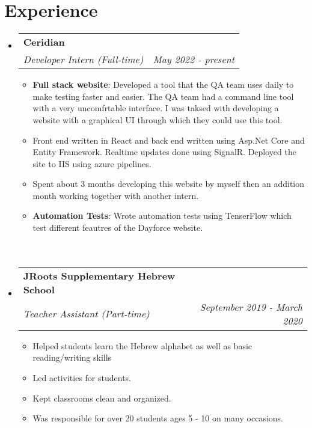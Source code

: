 \documentclass[a4paper,20pt]{article}
\makeatletter
\newcommand{\resumeItem}[2]{
	\item\small{
		\textbf{#1}{: #2 \vspace{-2pt}}
	}
}
\newcommand{\resumeSubheading}[4]{
	\vspace{-1pt}\item
	\begin{tabular*}{0.97\textwidth}{l@{\extracolsep{\fill}}r}
		\textbf{#1} & #2 \\
		\textit{#3} & \textit{#4} \\
	\end{tabular*}\vspace{-5pt}
}
\newcommand{\resumeSubHeadingListStart}{\begin{itemize}[leftmargin=*]}
\newcommand{\resumeSubHeadingListEnd}{\end{itemize}}
\newcommand{\resumeItemListStart}{\begin{itemize}}
\newcommand{\resumeItemListEnd}{\end{itemize}\vspace{-5pt}}
\makeatother
\begin{document}
	\section{Experience}
	\resumeSubHeadingListStart
	\resumeSubheading{Ceridian}{}
	{Developer Intern (Full-time)}{May 2022 - present}
	\resumeItemListStart
	\resumeItem{Full stack website}
	{Developed a tool that the QA team uses daily to make testing faster and easier. The QA team had a command line tool with a very uncomfrtable interface. I was taksed with developing a website with a graphical UI through which they could use this tool. }
	\item\small{
	Front end written in React and back end written using Asp.Net Core and Entity Framework. Realtime updates done using SignalR. Deployed the site to IIS using azure pipelines. 
	}
	\item\small{
		Spent about 3 months developing this website by myself then an addition month working together with another intern.
	}
	\resumeItem{Automation Tests}
	{Wrote automation tests using TenserFlow which test different feautres of the Dayforce website.\\ ~~~~~~~~~~~~~~~~~~~~~~~~~~~~~~~~~~~~~~~~~~~~~~~~~~~~~~~~~~~~~~~~~~~~~~~~~~~~~~~~~~~~~~~~~~~~~~~~~~~~~~~~~~~~~~~~~~}
	\resumeItemListEnd
	\vspace{-5pt}
	\resumeSubheading
	{JRoots Supplementary Hebrew School}{}
	{Teacher Assistant (Part-time)}{September 2019 -  March 2020}
	\resumeItemListStart
	\item\small{
		{Helped students learn the Hebrew alphabet as well as basic reading/writing skills}
	}
	\item\small{
		{Led activities for students.}
	}
	\item\small{
		{Kept classrooms clean and organized.}
	}
	\item\small{
		{Was responsible for over 20 students ages 5 - 10 on many occasions. }
	}
	\resumeItemListEnd
	
	\resumeSubHeadingListEnd
	
	\vspace{-5pt}
\end{document}
